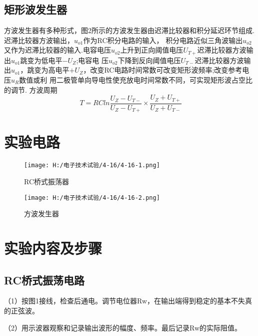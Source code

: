 \documentclass{article}
\begin{document}
                \subsection{矩形波发生器}
                方波发生器有多种形式，图2所示的方波发生器由迟滞比较器和积分延迟环节组成.迟滞比较器方波输出，$u_{o1}$作为RC积分电路的输入，
                积分电路近似三角波输出$u_{o2}$又作为迟滞比较器的输入.电容电压$u_{o2}$上升到正向阈值电压$U_{T+}$迟滞比较器方波输出$u_{o1}$跳变为低电平$-U_Z$;电容电
                压$u_{o2}$下降到反向阈值电压$U_{T-}$迟滞比较器方波输出$u_{o1}$，跳变为高电平$+U_Z$，改变RC电路时间常数可改变矩形波频率;改变参考电压$u_R$数值或利
                用二极管单向导电性使充放电时间常数不同，可实现矩形波占空比的调节. 方波周期
                \begin{equation*}
                    \ T=RCln\frac{U_Z-U_{T-}}{U_Z-U_{T+}}\times \frac{U_Z+U_{T+}}{U_Z+U_{T-}}
                \end{equation*}


   

\section{ 实验电路}
\begin{figure}[h]
	\begin{minipage}[t]{0.5\linewidth} %
	  \centering   
	  \texttt{[image: H:/电子技术试验/4-16/4-16-1.png]}   
	  \caption{RC桥式振荡器}   
	  \label{fig:side:a}   
	\end{minipage}%
	\begin{minipage}[t]{0.5\linewidth}   
	  \centering   
	  \texttt{[image: H:/电子技术试验/4-16/4-16-2.png]}   
	  \caption{方波发生器}   
	  \label{fig:side:b}   
	\end{minipage}   
  \end{figure}


\section{ 实验内容及步骤}
  \subsection{RC桥式振荡电路}
（1）按图1接线，检查后通电。调节电位器Rw，在输出端得到稳定的基本不失真的正弦波。\par
（2）用示波器观察和记录输出波形的幅度、频率。最后记录Rw的实际阻值。
\end{document}

